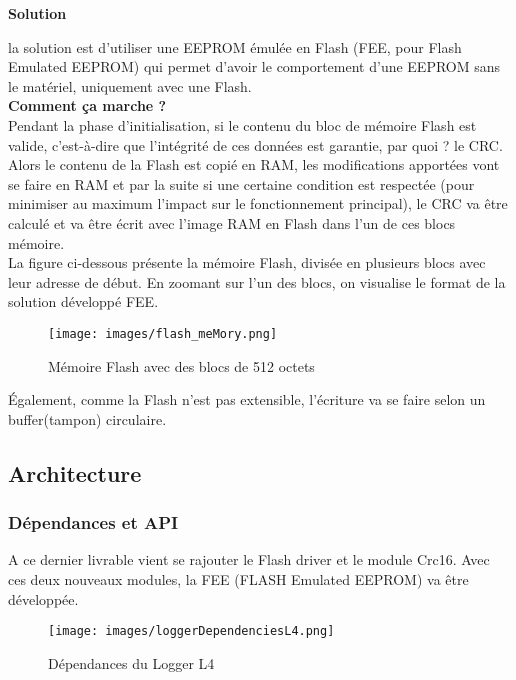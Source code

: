 \documentclass[a4paper, 12pt]{report}
\begin{document}
\textbf{Solution}

la solution est d'utiliser une EEPROM émulée en Flash (\acs{FEE}, pour Flash Emulated EEPROM) qui permet d'avoir le comportement d'une EEPROM sans le matériel, uniquement avec une Flash.\\

\textbf{Comment ça marche ?}\\
Pendant la phase d'initialisation, si le contenu du bloc de mémoire Flash est valide, c'est-à-dire que l'intégrité de ces données est garantie, par quoi ? le CRC.
Alors le contenu de la Flash est copié en RAM, les modifications apportées vont se faire en RAM et par la suite si une certaine condition est respectée (pour minimiser au maximum l'impact sur le fonctionnement principal), le CRC va être calculé et va être écrit avec l'image RAM en Flash dans l'un de ces blocs mémoire.
\\

La figure ci-dessous présente la mémoire Flash, divisée en plusieurs blocs avec leur adresse de début. En zoomant sur l'un des blocs, on visualise le format de la solution développé FEE.
\begin{figure}[H]
           \centering
           \texttt{[image: images/flash\_meMory.png]}
           \caption{Mémoire Flash avec des blocs de 512 octets}
           \label{fig:fee}
       \end{figure}
       
Également, comme la Flash n'est pas extensible, l'écriture va se faire selon un buffer(tampon) circulaire.\\



\subsection{Architecture}

\subsubsection{Dépendances et API}
A ce dernier livrable vient se rajouter le Flash driver et le module Crc16. Avec ces deux nouveaux modules, la FEE (FLASH Emulated EEPROM) va être développée.
\begin{figure}[H]
           \centering
           \texttt{[image: images/loggerDependenciesL4.png]}
           \caption{Dépendances du Logger L4}
           \label{fig:depdenL4}
       \end{figure}
\end{document}
